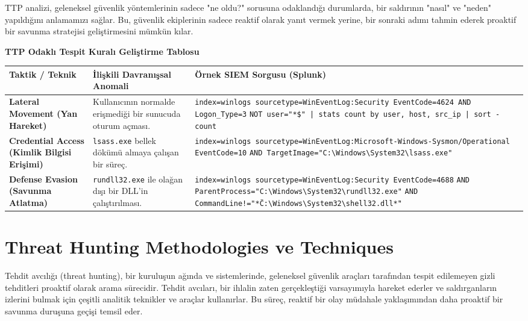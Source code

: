 TTP analizi, geleneksel güvenlik yöntemlerinin sadece "ne oldu?" sorusuna odaklandığı durumlarda, bir saldırının "nasıl" ve "neden" yapıldığını anlamamızı sağlar. Bu, güvenlik ekiplerinin sadece reaktif olarak yanıt vermek yerine, bir sonraki adımı tahmin ederek proaktif bir savunma stratejisi geliştirmesini mümkün kılar.

\textbf{TTP Odaklı Tespit Kuralı Geliştirme Tablosu}

\begin{tabularx}{\textwidth}{|l|X|X|}
\hline
\textbf{Taktik / Teknik} & \textbf{İlişkili Davranışsal Anomali} & \textbf{Örnek SIEM Sorgusu (Splunk)} \\
\hline
\textbf{Lateral Movement (Yan Hareket)} & Kullanıcının normalde erişmediği bir sunucuda oturum açması. & \texttt{index=winlogs sourcetype=WinEventLog:Security EventCode=4624 AND Logon\_Type=3} \texttt{NOT user="*\$" | stats count by user, host, src\_ip | sort -count} \\
\hline
\textbf{Credential Access (Kimlik Bilgisi Erişimi)} & \texttt{lsass.exe} bellek dökümü almaya çalışan bir süreç. & \texttt{index=winlogs sourcetype=WinEventLog:Microsoft-Windows-Sysmon/Operational EventCode=10} \texttt{AND TargetImage="C:\textbackslash Windows\textbackslash System32\textbackslash lsass.exe"} \\
\hline
\textbf{Defense Evasion (Savunma Atlatma)} & \texttt{rundll32.exe} ile olağan dışı bir DLL'in çalıştırılması. & \texttt{index=winlogs sourcetype=WinEventLog:Security EventCode=4688} \texttt{AND ParentProcess="C:\textbackslash Windows\textbackslash System32\textbackslash rundll32.exe"} \texttt{AND CommandLine!="*\"C:\textbackslash Windows\textbackslash System32\textbackslash shell32.dll\"*"} \\
\hline
\end{tabularx}

\section{Threat Hunting Methodologies ve Techniques}

Tehdit avcılığı (threat hunting), bir kuruluşun ağında ve sistemlerinde, geleneksel güvenlik araçları tarafından tespit edilemeyen gizli tehditleri proaktif olarak arama sürecidir. Tehdit avcıları, bir ihlalin zaten gerçekleştiği varsayımıyla hareket ederler ve saldırganların izlerini bulmak için çeşitli analitik teknikler ve araçlar kullanırlar. Bu süreç, reaktif bir olay müdahale yaklaşımından daha proaktif bir savunma duruşuna geçişi temsil eder.

